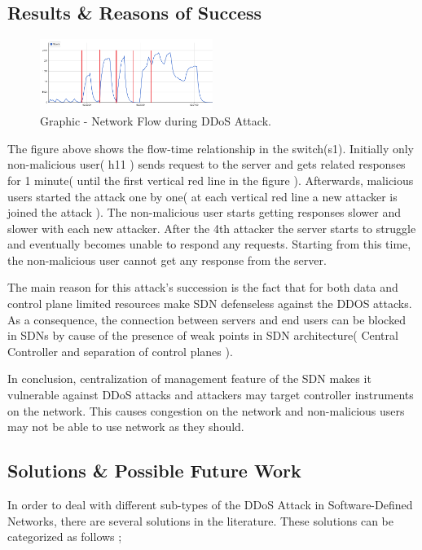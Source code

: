 \documentclass[conference,compsoc]{IEEEtran}
\begin{document}
\subsection{Results \& Reasons of Success}
\begin{figure}[H]
\centering
\includegraphics[width=0.5\textwidth]{attackers.png}
\caption{\label{fig:diagram_2}Graphic - Network Flow during DDoS Attack.}
\end{figure}

The figure above shows the flow-time relationship in the switch(s1). Initially only non-malicious user( h11 ) sends request to the server and gets related responses for 1 minute( until the first vertical red line in the figure ). Afterwards, malicious users started the attack one by one( at each vertical red line a new attacker is joined the attack ). The non-malicious user starts getting responses slower and slower with each new attacker. After the 4th attacker the server starts to struggle and eventually becomes unable to respond any requests. Starting from this time, the non-malicious user cannot get any response from the server.

The main reason for this attack's succession is the fact that for both data and control plane limited resources make SDN defenseless against the DDOS attacks. As a consequence, the connection between servers and end users can be blocked in SDNs by cause of the presence of  weak points in SDN architecture( Central Controller and separation of control planes ).

In conclusion, centralization of management feature of the SDN makes it vulnerable against DDoS attacks and attackers may target controller instruments on the network. This causes congestion on the network and non-malicious users may not be able to use network as they should. 

\subsection{Solutions \& Possible Future Work}
In order to deal with different sub-types of the DDoS Attack in Software-Defined Networks, there are several solutions in the literature. These solutions can be categorized as follows \cite{Kokila};
\end{document}
